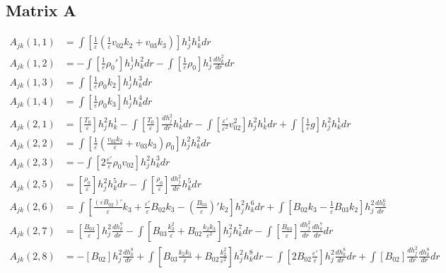 \documentclass[11pt, fleqn]{article}
\newcommand{\eps}{\varepsilon}
\begin{document}
\subsection{Matrix A}
\begingroup
\allowdisplaybreaks
\addtolength{\jot}{10pt}

\begin{align*}
	A_{jk}(1, 1) &=  \int \left[\frac{1}{\eps}\left(\frac{1}{\eps}v_{02}k_2 + v_{03}k_3\right)\right] h_j^1 h_k^1 dr									\\
	A_{jk}(1, 2) &= -\int \left[\frac{1}{\eps}\rho_0'\right] h_j^1 h_k^2 dr - \int  \left[\frac{1}{\eps}\rho_0\right] h_j^1 \frac{dh_k^2}{dr} dr		\\
	A_{jk}(1, 3) &=  \int \left[\frac{1}{\eps}\rho_0 k_2\right] h_j^1 h_k^3 dr																			\\
	A_{jk}(1, 4) &=  \int \left[\frac{1}{\eps}\rho_0 k_3\right] h_j^1 h_k^4 dr																			\\
	A_{jk}(2, 1) &=  \left[\frac{T_0}{\eps}\right] h_j^2 h_k^1 - \int \left[\frac{T_0}{\eps}\right] \frac{dh_j^2}{dr} h_k^1 dr - \int \left[\frac{\eps'}{\eps^2}v_{02}^2\right]h_j^2h_k^1 dr + \int \left[\frac{1}{\eps}g\right]h_j^2h_k^1 dr			\\
	A_{jk}(2, 2) &=  \int \left[\frac{1}{\eps}\left(\frac{v_{02}k_2}{\eps} + v_{03}k_3\right)\rho_0\right]h_j^2h_k^2 dr									\\
	A_{jk}(2, 3) &= -\int \left[2\frac{\eps'}{\eps}\rho_0v_{02}\right]h_j^2 h_k^3 dr																	\\
	A_{jk}(2, 5) &=  \left[\frac{\rho_0}{\eps}\right]h_j^2 h_k^5 dr - \int \left[\frac{\rho_0}{\eps}\right]\frac{dh_j^2}{dr}h_k^5 dr					\\
	A_{jk}(2, 6) &=  \int \left[\frac{(\eps B_{02})'}{\eps}k_3 + \frac{\eps'}{\eps}B_{02}k_3 -\left(\frac{B_{03}}{\eps}\right)'k_2\right] h_j^2 h_k^6 dr  + \int \left[B_{02}k_3 - \frac{1}{\eps}B_{03}k_2\right] h_j^2 \frac{dh_k^6}{dr} 				\\
	A_{jk}(2, 7) &=  \left[\frac{B_{03}}{\eps}\right] h_j^2 \frac{dh_k^7}{dr} - \int \left[B_{03}\frac{k_3^2}{\eps} + B_{02}\frac{k_2k_3}{\eps^2}\right] h_j^2 h_k^7 dr - \int \left[\frac{B_{03}}{\eps}\right]\frac{dh_j^2}{dr}\frac{dh_k^7}{dr}dr		\\
	A_{jk}(2, 8) &=  -\left[B_{02}\right]h_j^2\frac{dh_k^8}{dr} + \int \left[B_{03}\frac{k_2k_3}{\eps} + B_{02}\frac{k_2^2}{\eps^2}\right] h_j^2 h_k^8 dr - \int \left[2B_{02}\frac{\eps'}{\eps}\right]h_j^2 \frac{dh_k^8}{dr} dr	
					+\int \left[B_{02}\right]\frac{dh_j^2}{dr}\frac{dh_k^8}{dr}dr																		\\

\end{align*}
\end{document}
